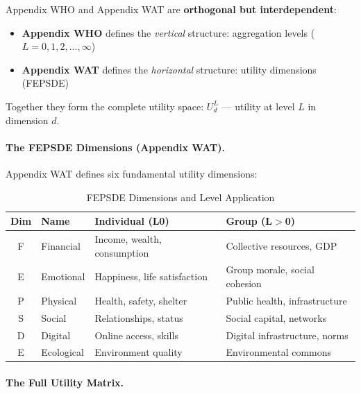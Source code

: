 \begin{tcolorbox}[colback=blue!5!white, colframe=blue!75!black, title=The AAA-C Connection: Levels $\times$ Dimensions]
Appendix WHO and Appendix WAT are \textbf{orthogonal but interdependent}:
\begin{itemize}[nosep]
\item \textbf{Appendix WHO} defines the \textit{vertical} structure: aggregation levels ($L = 0, 1, 2, ..., \infty$)
\item \textbf{Appendix WAT} defines the \textit{horizontal} structure: utility dimensions (FEPSDE)
\end{itemize}

Together they form the complete utility space: $U^L_d$ --- utility at level $L$ in dimension $d$.
\end{tcolorbox}

\paragraph{The FEPSDE Dimensions (Appendix WAT).}

Appendix WAT defines six fundamental utility dimensions:

\begin{table}[htbp]
\centering
\caption{FEPSDE Dimensions and Level Application}
\label{tab:aaa-fepsde-levels}
\renewcommand{\arraystretch}{1.3}
\begin{tabular}{@{}clp{5cm}p{4cm}@{}}
\toprule
\textbf{Dim} & \textbf{Name} & \textbf{Individual (L0)} & \textbf{Group (L$>$0)} \\
\midrule
F & Financial & Income, wealth, consumption & Collective resources, GDP \\
E & Emotional & Happiness, life satisfaction & Group morale, social cohesion \\
P & Physical & Health, safety, shelter & Public health, infrastructure \\
S & Social & Relationships, status & Social capital, networks \\
D & Digital & Online access, skills & Digital infrastructure, norms \\
E & Ecological & Environment quality & Environmental commons \\
\bottomrule
\end{tabular}
\end{table}

\paragraph{The Full Utility Matrix.}

